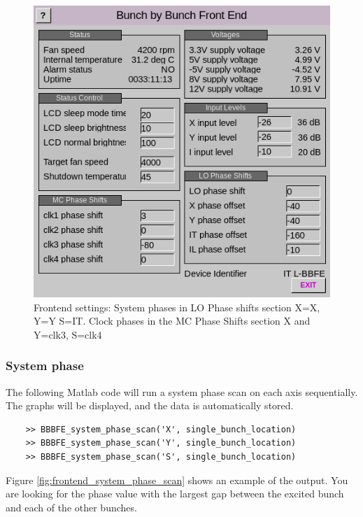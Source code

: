 \documentclass{report}
\begin{document}
\begin{figure}
    \centering
    \includegraphics[width=0.6\linewidth]{BBBFE_settings.png}
    \caption{Frontend settings: System phases in LO Phase shifts section  X=X, Y=Y S=IT. Clock phases in the MC Phase Shifts section X and Y=clk3, S=clk4}
    \label{fig:BBBFE_settings}
\end{figure}
\clearpage


\subsubsection{System phase}
 
The following Matlab code will run a system phase scan on each axis sequentially. The graphs will be displayed, and the data is automatically stored. 

\begin{verbatim}
    >> BBBFE_system_phase_scan('X', single_bunch_location)
    >> BBBFE_system_phase_scan('Y', single_bunch_location)
    >> BBBFE_system_phase_scan('S', single_bunch_location)
\end{verbatim}

Figure \ref{fig:frontend_system_phase_scan} shows an example of the output. You are looking for the phase value with the largest gap between the excited bunch and each of the other bunches. 
\end{document}
